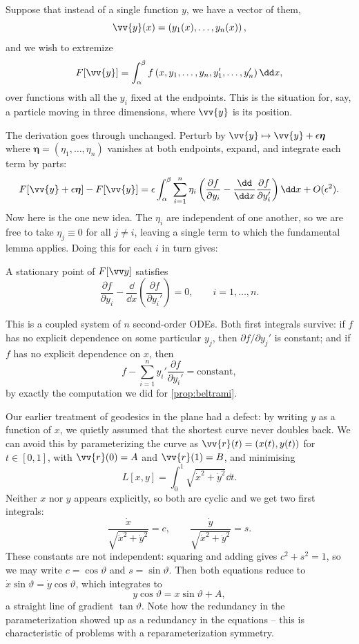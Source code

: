 \documentclass[a4paper]{scrartcl}
\begin{document}
Suppose that instead of a single function $y$, we have a vector of them,
$$
\vv{y}(x) = \left(y_1(x), \dots, y_n(x)\right),
$$
and we wish to extremize
$$
F[\vv{y}] = \int_\alpha^\beta f\left(x, y_1, \dots, y_n, y_1', \dots, y_n'\right)\dd x,
$$
over functions with all the $y_i$ fixed at the endpoints. This is the situation for, say, a particle moving in three dimensions, where $\vv{y}$ is its position.

The derivation goes through unchanged. Perturb by $\vv{y} \mapsto \vv{y} + \epsilon \bm{\eta}$ where $\bm\eta = (\eta_1, \dots, \eta_n)$ vanishes at both endpoints, expand, and integrate each term by parts:
$$
F[\vv{y} + \epsilon\bm\eta] - F[\vv{y}] = \epsilon\int_\alpha^\beta \sum_{i=1}^n \eta_i \left(\frac{\partial f}{\partial y_i} - \frac{\dd}{\dd x}\frac{\partial f}{\partial y_i'}\right)\dd x + O(\epsilon^2).
$$
Now here is the one new idea. The $\eta_i$ are independent of one another, so we are free to take $\eta_j \equiv 0$ for all $j \neq i$, leaving a single term to which the fundamental lemma applies. Doing this for each $i$ in turn gives:

\begin{theorem}
	A stationary point of $F[\vv y]$ satisfies
	$$
	\frac{\partial f}{\partial y_i} - \frac{\dd}{\dd x}\left(\frac{\partial f}{\partial y_i'}\right) = 0, \qquad i = 1, \dots, n.
	$$
\end{theorem}

This is a coupled system of $n$ second-order ODEs. Both first integrals survive: if $f$ has no explicit dependence on some particular $y_j$, then $\partial f/\partial y_j' $ is constant; and if $f$ has no explicit dependence on $x$, then
$$
f - \sum_{i=1}^n y_i' \frac{\partial f}{\partial y_i'} = \text{constant},
$$
by exactly the computation we did for \autoref{prop:beltrami}.

\begin{example}
	Our earlier treatment of geodesics in the plane had a defect: by writing $y$ as a function of $x$, we quietly assumed that the shortest curve never doubles back. We can avoid this by parameterizing the curve as $\vv{r}(t) = (x(t), y(t))$ for $t \in [0,1]$, with $\vv{r}(0) = A$ and $\vv{r}(1) = B$, and minimising
	$$
	L[x, y] = \int_0^1 \sqrt{\dot x^2 + \dot y^2}\dd t.
	$$
	Neither $x$ nor $y$ appears explicitly, so both are cyclic and we get two first integrals:
	$$
	\frac{\dot x}{\sqrt{\dot x^2 + \dot y^2}} = c, \qquad \frac{\dot y}{\sqrt{\dot x^2 + \dot y^2}} = s.
	$$
	These constants are not independent: squaring and adding gives $c^2 + s^2 = 1$, so we may write $c = \cos\vartheta$ and $s = \sin\vartheta$. Then both equations reduce to $\dot x \sin\vartheta = \dot y \cos\vartheta$, which integrates to
	$$
	y\cos\vartheta = x \sin\vartheta + A,
	$$
	a straight line of gradient $\tan\vartheta$. Note how the redundancy in the parameterization showed up as a redundancy in the equations -- this is characteristic of problems with a reparameterization symmetry.
\end{example}
\end{document}
